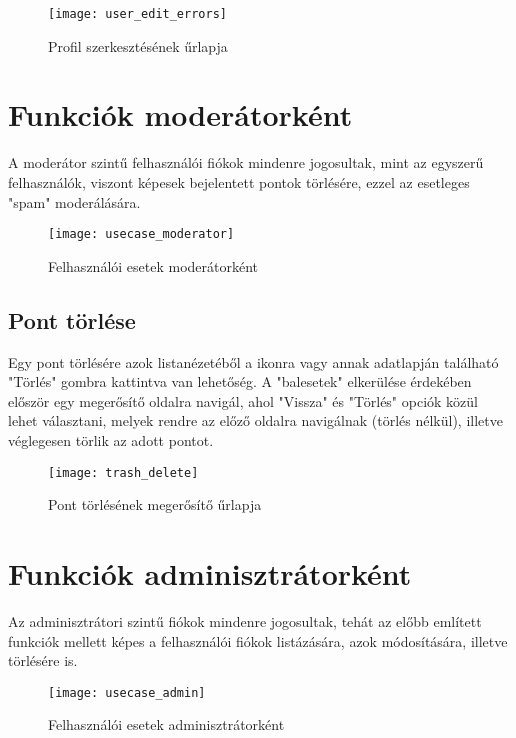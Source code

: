\begin{figure}[H]
	\centering
	\texttt{[image: user\_edit\_errors]}
	\caption{Profil szerkesztésének űrlapja}
	\label{fig:user_edit_errors}
\end{figure}

\section{Funkciók moderátorként}

A moderátor szintű felhasználói fiókok mindenre jogosultak, mint az egyszerű felhasználók, viszont képesek bejelentett pontok törlésére, ezzel az esetleges "spam" moderálására.

\begin{figure}[H]
	\centering
	\texttt{[image: usecase\_moderator]}
	\caption{Felhasználói esetek moderátorként}
	\label{fig:usecase_moderator}
\end{figure}

\subsection{Pont törlése}
\label{subsec:trash_delete}

Egy pont törlésére azok listanézetéből a  ikonra vagy annak adatlapján található "Törlés" gombra kattintva van lehetőség. A "balesetek" elkerülése érdekében először egy megerősítő oldalra navigál, ahol "Vissza" és "Törlés" opciók közül lehet választani, melyek rendre az előző oldalra navigálnak (törlés nélkül), illetve véglegesen törlik az adott pontot.

\begin{figure}[H]
	\centering
	\texttt{[image: trash\_delete]}
	\caption{Pont törlésének megerősítő űrlapja}
	\label{fig:trash_delete}
\end{figure}

\section{Funkciók adminisztrátorként}

Az adminisztrátori szintű fiókok mindenre jogosultak, tehát az előbb említett funkciók mellett képes a felhasználói fiókok listázására, azok módosítására, illetve törlésére is.

\begin{figure}[H]
	\centering
	\texttt{[image: usecase\_admin]}
	\caption{Felhasználói esetek adminisztrátorként}
	\label{fig:usecase_admin}
\end{figure}

